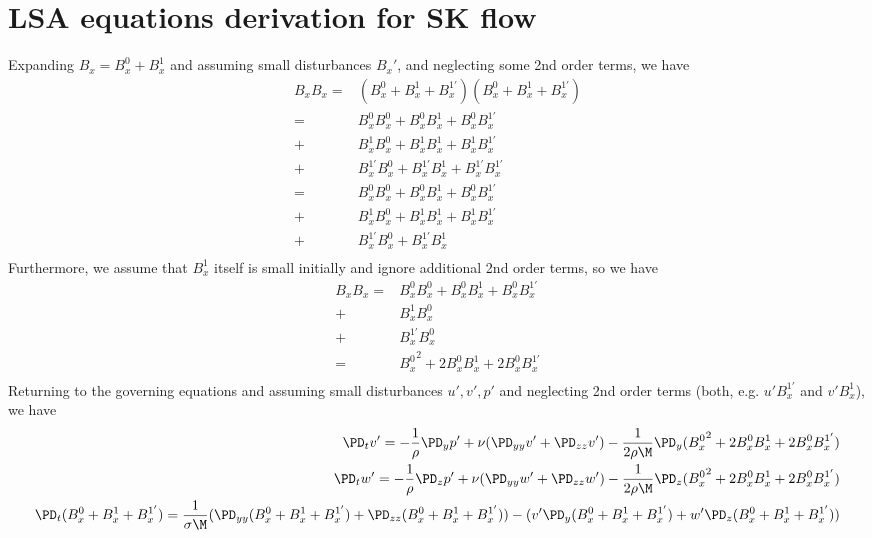 \documentclass[11pt]{article}
\begin{document}
\section{LSA equations derivation for SK flow}
Expanding $B_x=B_x^0+B_x^1$ and assuming small disturbances $B_x'$, and neglecting some 2nd order terms, we have
\begin{equation}\begin{aligned}
B_xB_x = & (B_x^{0}+B_x^{1}+B_x^{1'}) (B_x^{0}+B_x^{1}+B_x^{1'}) \\
       = & B_x^{0 }B_x^{0 } + B_x^{0 }B_x^{1 } + B_x^{0 }B_x^{1'} \\
       + & B_x^{1 }B_x^{0 } + B_x^{1 }B_x^{1 } + B_x^{1 }B_x^{1'} \\
       + & B_x^{1'}B_x^{0 } + B_x^{1'}B_x^{1 } + B_x^{1'}B_x^{1'} \\
       = & B_x^{0 }B_x^{0 } + B_x^{0 }B_x^{1 } + B_x^{0 }B_x^{1'} \\
       + & B_x^{1 }B_x^{0 } + B_x^{1 }B_x^{1 } + B_x^{1 }B_x^{1'} \\
       + & B_x^{1'}B_x^{0 } + B_x^{1'}B_x^{1 } \\
\end{aligned} \end{equation}
Furthermore, we assume that $B_x^1$ itself is small initially and ignore additional 2nd order terms, so we have
\begin{equation}\begin{aligned}
B_xB_x = & B_x^{0 }B_x^{0 } + B_x^{0 }B_x^{1 } + B_x^{0 }B_x^{1'} \\
       + & B_x^{1 }B_x^{0 } \\
       + & B_x^{1'}B_x^{0 } \\
       = & {B_x^{0 }}^2 + 2 B_x^{0 }B_x^{1 } + 2 B_x^{0 }B_x^{1'} \\
\end{aligned} \end{equation}
Returning to the governing equations and assuming small disturbances $u',v',p'$ and neglecting 2nd order terms (both, e.g. $u'B_x^{1'}$ and $v'B_x^1$), we have
\tiny\begin{equation}\begin{aligned}
\PD_t v' = -\frac{1}{\rho}\PD_y p' + \nu (\PD_{yy} v'+\PD_{zz} v') - \frac{1}{2\rho \M} \PD_y ({B_x^{0 }}^2 + 2 B_x^{0 }B_x^{1 } + 2 B_x^{0 }B_x^{1'}) \\
\PD_t w' = -\frac{1}{\rho}\PD_z p' + \nu (\PD_{yy} w'+\PD_{zz} w') - \frac{1}{2\rho \M} \PD_z ({B_x^{0 }}^2 + 2 B_x^{0 }B_x^{1 } + 2 B_x^{0 }B_x^{1'}) \\
\PD_t (B_x^{0}+B_x^{1}+B_x^{1'}) = \frac{1}{\sigma \M} (\PD_{yy} (B_x^{0}+B_x^{1}+B_x^{1'})+\PD_{zz} (B_x^{0}+B_x^{1}+B_x^{1'})) - (v' \PD_y (B_x^{0}+B_x^{1}+B_x^{1'}) + w'\PD_z (B_x^{0}+B_x^{1}+B_x^{1'})) \\
\end{aligned} \end{equation}\normalsize
\end{document}
